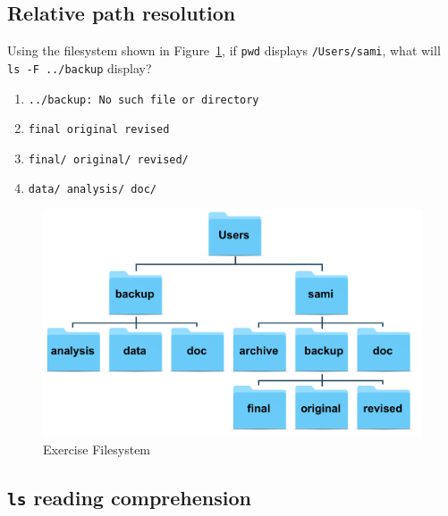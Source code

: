 \documentclass[
]{krantz}
\providecommand{\tightlist}{%
  \setlength{\itemsep}{0pt}\setlength{\parskip}{0pt}}
\begin{document}
\hypertarget{bash-basics-ex-resolve-rel-path}{%
\subsection{Relative path resolution}\label{bash-basics-ex-resolve-rel-path}}

Using the filesystem shown in Figure~\ref{fig:bash-basics-ex-rel-path},
if \texttt{pwd} displays \texttt{/Users/sami},
what will \texttt{ls\ -F\ ../backup} display?

\begin{enumerate}
\def\labelenumi{\arabic{enumi}.}
\tightlist
\item
  \texttt{../backup:\ No\ such\ file\ or\ directory}
\item
  \texttt{final\ original\ revised}
\item
  \texttt{final/\ original/\ revised/}
\item
  \texttt{data/\ analysis/\ doc/}
\end{enumerate}

\begin{figure}

{\centering \includegraphics[width=1\linewidth]{figures/bash-basics/exercise-filesystem} 

}

\caption{Exercise Filesystem}\label{fig:bash-basics-ex-rel-path}
\end{figure}

\hypertarget{bash-basics-ex-reading-ls}{%
\subsection{\texorpdfstring{\texttt{ls} reading comprehension}{ls reading comprehension}}\label{bash-basics-ex-reading-ls}}
\end{document}
